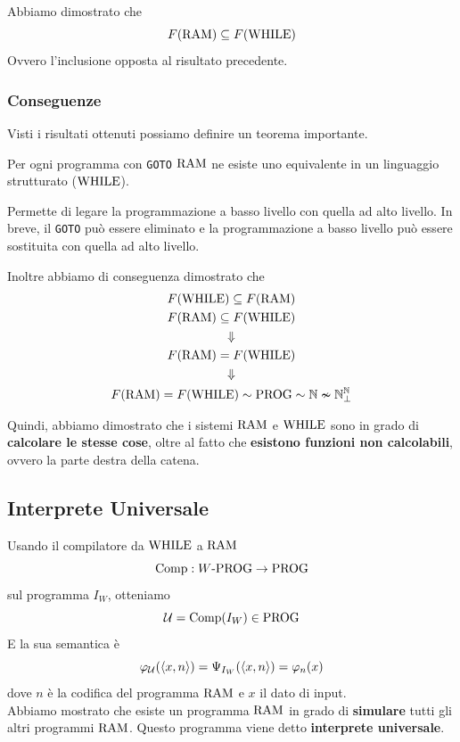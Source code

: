 Abbiamo dimostrato che
$$ F(\text{RAM}) \subseteq F(\text{WHILE}) $$
Ovvero l'inclusione opposta al risultato precedente.

\subsubsection{Conseguenze}
Visti i risultati ottenuti possiamo definire un teorema importante.\\

\begin{theor}
	Per ogni programma con \texttt{GOTO} $\text{RAM}$ ne esiste uno equivalente in un linguaggio strutturato ($\text{WHILE}$).
\end{theor}

Permette di legare la programmazione a basso livello con quella ad alto livello. In breve, il \texttt{GOTO} può essere eliminato e la programmazione a basso livello può essere sostituita con quella ad alto livello.

Inoltre abbiamo di conseguenza dimostrato che
\begin{gather*}
	F(\text{WHILE}) \subseteq F(\text{RAM}) \\
	F (\text{RAM}) \subseteq F(\text{WHILE}) \\
	\Downarrow \\
	F(\text{RAM}) = F(\text{WHILE}) \\
	\Downarrow \\
	F(\text{RAM}) = F(\text{WHILE}) \sim \text{PROG} \sim \mathbb{N} \nsim \mathbb{N}^\mathbb{N}_\bot
\end{gather*}

Quindi, abbiamo dimostrato che i sistemi $\text{RAM}$ e $\text{WHILE}$ sono in grado di \textbf{calcolare le stesse cose}, oltre al fatto che \textbf{esistono funzioni non calcolabili}, ovvero la parte destra della catena.

\subsection{Interprete Universale}
Usando il compilatore da $\text{WHILE}$ a $\text{RAM}$
$$ \text{Comp}: W\text{-PROG} \rightarrow \text{PROG} $$
sul programma $I_W$, otteniamo
$$ \mathcal{U} = \text{Comp}(I_W) \in \text{PROG} $$
E la sua semantica è 
$$ \varphi_{\mathcal{U}} (\langle x,n \rangle) = \Psi_{I_W} (\langle x,n \rangle) = \varphi_n(x) $$
dove $n$ è la codifica del programma $\text{RAM}$ e $x$ il dato di input.\\

Abbiamo mostrato che esiste un programma $\text{RAM}$ in grado di \textbf{simulare} tutti gli altri programmi $\text{RAM}$. Questo programma viene detto \textbf{interprete universale}.

